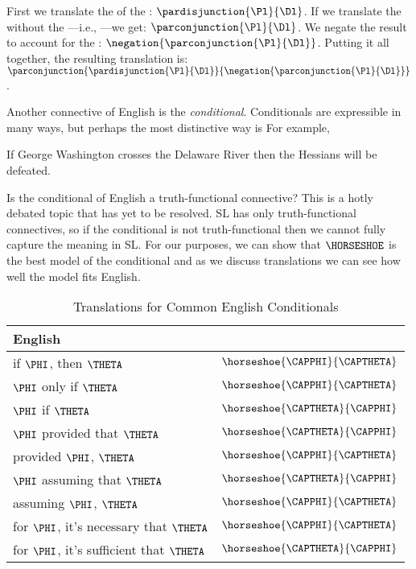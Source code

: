 \noindent{}First we translate the  of the : $\pardisjunction{\Pl}{\Dl}$.  If we translate the  without the ---i.e., ---we get: $\parconjunction{\Pl}{\Dl}$.  We negate the result to account for the : $\negation{\parconjunction{\Pl}{\Dl}}$.  Putting it all together, the resulting translation is: $\parconjunction{\pardisjunction{\Pl}{\Dl}}{\negation{\parconjunction{\Pl}{\Dl}}}$.

Another connective of English is the \emph{conditional}.  Conditionals are expressible in many ways, but perhaps the most distinctive way is   For example,

\begin{menumerate}
	\item If George Washington crosses the Delaware River then the Hessians will be defeated.
\end{menumerate}

\noindent{}Is the conditional of English a truth-functional connective?  This is a hotly debated topic that has yet to be resolved.  SL has only truth-functional connectives, so if the conditional is not truth-functional then we cannot fully capture the meaning in SL.  For our purposes, we can show that $\HORSESHOE$ is the best model of the conditional and as we discuss translations we can see how well the model fits English.

\begin{table}
	\renewcommand{\arraystretch}{1.5}%
	\begin{center}
		\begin{tabular}{ l l } %
			\toprule
			\textbf{English} & \textbf{\GSL{}} \\ 
			\midrule
			if $\PHI$, then $\THETA$ & $\horseshoe{\CAPPHI}{\CAPTHETA}$ \\
			$\PHI$ only if $\THETA$ & $\horseshoe{\CAPPHI}{\CAPTHETA}$ \\
			$\PHI$ if $\THETA$ & $\horseshoe{\CAPTHETA}{\CAPPHI}$ \\
			$\PHI$ provided that $\THETA$ & $\horseshoe{\CAPTHETA}{\CAPPHI}$ \\
			provided $\PHI$, $\THETA$ & $\horseshoe{\CAPPHI}{\CAPTHETA}$ \\
			$\PHI$ assuming that $\THETA$ & $\horseshoe{\CAPTHETA}{\CAPPHI}$ \\
			assuming $\PHI$, $\THETA$ & $\horseshoe{\CAPPHI}{\CAPTHETA}$ \\
			for $\PHI$, it's necessary that $\THETA$ & $\horseshoe{\CAPPHI}{\CAPTHETA}$ \\
			for $\PHI$, it's sufficient that $\THETA$ & $\horseshoe{\CAPTHETA}{\CAPPHI}$ \\
			\bottomrule
		\end{tabular}%
		\caption{Translations for Common English Conditionals}
		\label{TransTableA}
	\end{center}
\end{table}

